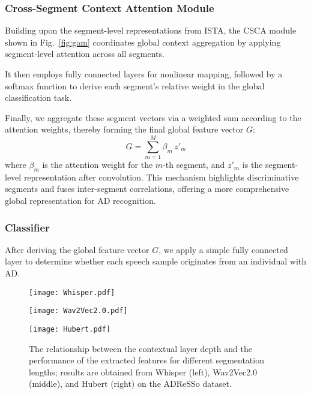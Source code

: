 \documentclass[journal]{IEEEtran}
\begin{document}
\subsubsection{Cross-Segment Context Attention Module}

Building upon the segment-level representations from ISTA, the CSCA module shown in Fig.~\ref{fig:gam} coordinates global context aggregation by applying segment-level attention across all segments.

It then employs fully connected layers for nonlinear mapping, followed by a softmax function to derive each segment’s relative weight in the global classification task.

Finally, we aggregate these segment vectors via a weighted sum according to the attention weights, thereby forming the final global feature vector $G$:
\begin{equation}
G = \sum_{m=1}^{M} \beta_m \, z'_m
\end{equation}
where $\beta_m$ is the attention weight for the $m$-th segment, and $z'_m$ is the segment-level representation after convolution. 
This mechanism highlights discriminative segments and fuses inter-segment correlations, offering a more comprehensive global representation for AD recognition.

\subsubsection{Classifier}
After deriving the global feature vector $G$, we apply a simple fully connected layer to determine whether each speech sample originates from an individual with AD.

\begin{figure*}[ht]
\centering
% 
\begin{minipage}{0.32\textwidth}
\centering
\texttt{[image: Whisper.pdf]}
\end{minipage}
\hfill
% 
\begin{minipage}{0.32\textwidth}
\centering
\texttt{[image: Wav2Vec2.0.pdf]}
\end{minipage}
\hfill
% 
\begin{minipage}{0.32\textwidth}
\centering
\texttt{[image: Hubert.pdf]}
\end{minipage}
\caption{The relationship between the contextual layer depth and the performance of the extracted features for different segmentation lengths; results are obtained from Whisper (left), Wav2Vec2.0 (middle), and Hubert (right) on the ADReSSo dataset.}
\label{fig:result}
\end{figure*}
\end{document}
